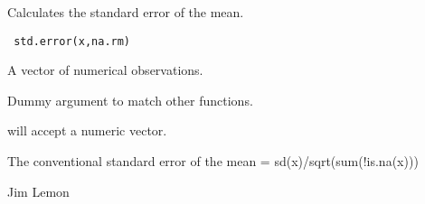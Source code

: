 \begin{Description}\relax
Calculates the standard error of the mean.
\end{Description}
\begin{Usage}
\begin{verbatim}
 std.error(x,na.rm)
\end{verbatim}
\end{Usage}
\begin{Arguments}
\begin{ldescription}
\item[\code{x}] A vector of numerical observations.
\item[\code{na.rm}] Dummy argument to match other functions.
\end{ldescription}
\end{Arguments}
\begin{Details}\relax
{} will accept a numeric vector.
\end{Details}
\begin{Value}
The conventional standard error of the mean = sd(x)/sqrt(sum(!is.na(x)))
\end{Value}
\begin{Author}\relax
Jim Lemon
\end{Author}
\begin{SeeAlso}\relax
{}
\end{SeeAlso}

